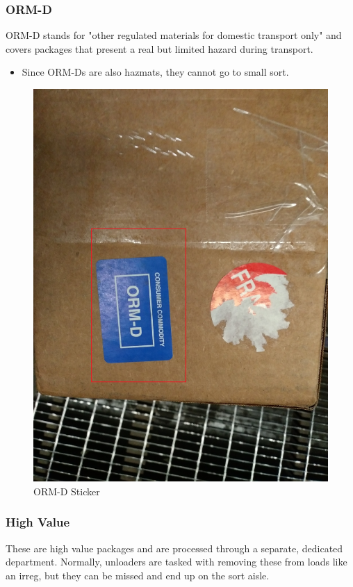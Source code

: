 \documentclass[12pt]{article}
\begin{document}







\subsubsection{ORM-D}
ORM-D stands for "other regulated materials for domestic transport only" and covers packages that present a real but limited hazard during transport. 

\begin{itemize}
    \item Since ORM-Ds are also hazmats, they cannot go to small sort.
\end{itemize}

\begin{figure}[H]
    \centering
    \includegraphics[width=0.4\linewidth]{20171221_171456}
    \caption{ORM-D Sticker}
\end{figure}

\subsubsection{High Value}
These are high value packages and are processed through a separate, dedicated department. Normally, unloaders are tasked with removing these from loads like an irreg, but they can be missed and end up on the sort aisle.
\end{document}
